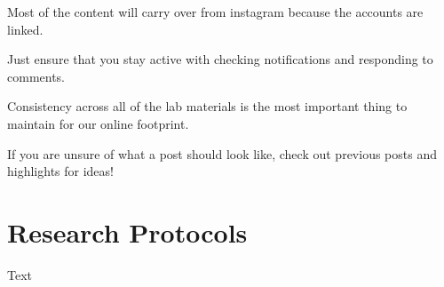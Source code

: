 \documentclass[]{book}
\begin{document}
Most of the content will carry over from instagram because the accounts are linked.

Just ensure that you stay active with checking notifications and responding to comments.

Consistency across all of the lab materials is the most important thing to maintain for our online footprint.

If you are unsure of what a post should look like, check out previous posts and highlights for ideas!

\hypertarget{research-protocols}{%
\chapter{Research Protocols}\label{research-protocols}}

Text


\end{document}
